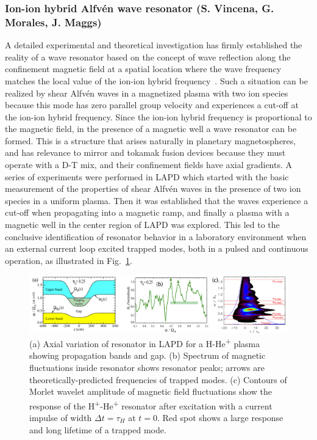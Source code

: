 \documentclass[11pt]{article}
\newcommand\Alfven{Alfv\'en }
\renewcommand{\cite}{\citep}
\begin{document}
\subsubsection{Ion-ion hybrid \Alfven wave resonator (S. Vincena, G. Morales, J.
Maggs)}

A detailed experimental and theoretical investigation has firmly
established the reality of a wave resonator based on the concept of
wave reflection along the confinement magnetic field at a spatial
location where the wave frequency matches the local value of the
ion-ion hybrid
frequency~\cite{vincena:2010,vincena:2011,farmer:2012,vincena:2013,farmer:2013}. Such
a situation can be realized by shear \Alfven waves in a magnetized
plasma with two ion species because this mode has zero parallel group
velocity and experiences a cut-off at the ion-ion hybrid
frequency. Since the ion-ion hybrid frequency is proportional to the
magnetic field, in the presence of a magnetic well a wave resonator
can be formed. This is a structure that arises naturally in planetary
magnetospheres, and has relevance to mirror and tokamak fusion devices
because they must operate with a D-T mix, and their confinement fields
have axial gradients. A series of experiments were performed in LAPD
which started with the basic measurement of the properties of shear
\Alfven waves in the presence of two ion species in a uniform plasma.
Then it was established that the waves experience a cut-off when
propagating into a magnetic ramp, and finally a plasma with a magnetic
well in the center region of LAPD was explored. This led to the
conclusive identification of resonator behavior in a laboratory
environment when an external current loop excited trapped modes, both
in a pulsed and continuous operation, as illustrated in Fig.~\ref{twoion}.


\begin{figure}[!htbp]
\centerline{\includegraphics[width=6.2truein]{twoion}}
\caption{\small (a) Axial variation of resonator in LAPD for a
H-He\textsuperscript{+} plasma showing propagation bands and gap. (b)
Spectrum of magnetic fluctuations inside resonator shows resonator
peaks; arrows are theoretically-predicted frequencies of trapped
modes. (c) Contours of Morlet wavelet amplitude of magnetic field
fluctuations show the response of the
H\textsuperscript{+}-He\textsuperscript{+} resonator after excitation
with a current impulse of width $\Delta t = \tau_H$ at
$t = 0$. Red spot shows a large response and long lifetime of a
trapped mode.}\label{twoion}
\end{figure}
\end{document}

